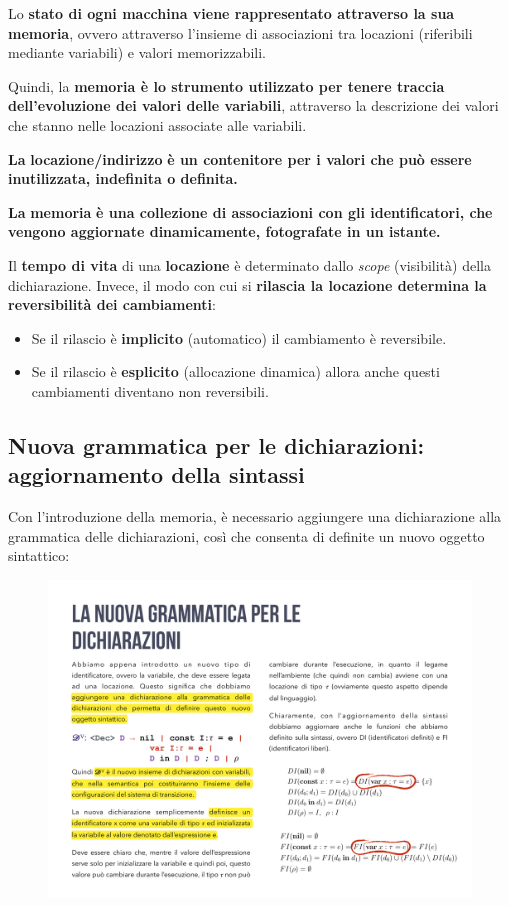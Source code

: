 \documentclass[a4paper]{article}
\begin{document}
	\noindent
	Lo \textbf{stato di ogni macchina viene rappresentato attraverso la sua memoria}, ovvero attraverso l'insieme di associazioni tra locazioni (riferibili mediante variabili) e valori memorizzabili.
	
	Quindi, la \textbf{memoria è lo strumento utilizzato per tenere traccia dell'evoluzione dei valori delle variabili}, attraverso la descrizione dei valori che stanno nelle locazioni associate alle variabili.\:\newline
	
	\noindent	
	\begin{boxdef}
		\textbf{La} \textcolor{Red3}{\textbf{locazione/indirizzo}} \textbf{è un contenitore per i valori che può essere inutilizzata, indefinita o definita.}
	\end{boxdef}\:\newline
	
	\noindent
	\begin{boxdef}
		\textbf{La} \textcolor{Red3}{\textbf{memoria}} \textbf{è una collezione di associazioni con gli identificatori, che vengono aggiornate dinamicamente, fotografate in un istante.}
	\end{boxdef}\:\newline

	\noindent
	Il \textbf{tempo di vita} di una \textbf{locazione} è determinato dallo \emph{scope} (visibilità) della dichiarazione. Invece, il modo con cui si \textbf{rilascia la locazione determina la reversibilità dei cambiamenti}:
	\begin{itemize}
		\item Se il rilascio è \textbf{implicito} (automatico) il cambiamento è reversibile.
		
		\item Se il rilascio è \textbf{esplicito} (allocazione dinamica) allora anche questi cambiamenti diventano non reversibili.
	\end{itemize}\newpage

	\subsection{Nuova grammatica per le dichiarazioni: aggiornamento della sintassi}
	
	Con l'introduzione della memoria, è necessario aggiungere una dichiarazione alla grammatica delle dichiarazioni, così che consenta di definite un nuovo oggetto sintattico:
	
	\begin{figure}[!htp]
		\centering
		\includegraphics[width=.6\textwidth]{img/grammatica_con_memoria.pdf}
	\end{figure}
\end{document}
